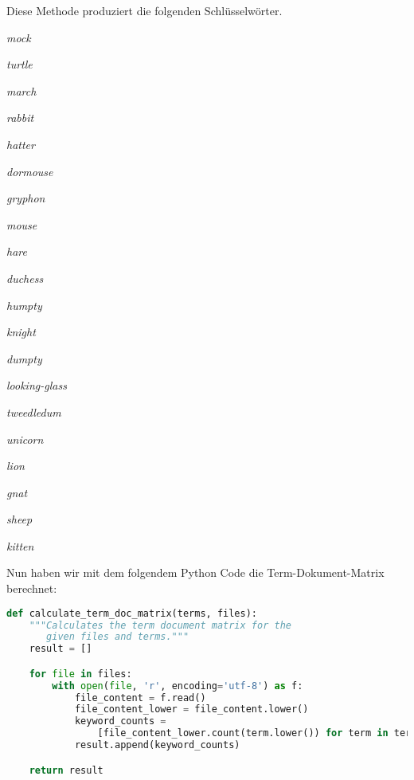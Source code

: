 \documentclass{article}
\begin{document}
\newpage
\noindent Diese Methode produziert die folgenden Schlüsselwörter.
\begin{center}
\begin{minipage}{.45\textwidth}
\begin{enumerate}
\begin{minipage}{0.35\linewidth}
    \item \textit{mock}
    \item \textit{turtle}
    \item \textit{march}
    \item \textit{rabbit}
    \item \textit{hatter}
    \item \textit{dormouse}
    \item \textit{gryphon}
    \item \textit{mouse}
    \item \textit{hare}
    \item \textit{duchess}
\end{minipage}
\begin{minipage}{0.35\linewidth}
    \item \textit{humpty}
    \item \textit{knight}
    \item \textit{dumpty}
    \item \textit{looking-glass}
    \item \textit{tweedledum}
    \item \textit{unicorn}
    \item \textit{lion}
    \item \textit{gnat}
    \item \textit{sheep}
    \item \textit{kitten}
\end{minipage}
\end{enumerate}
\end{minipage}
\end{center}
 Nun haben wir mit dem folgendem Python Code die Term-Dokument-Matrix berechnet:
\begin{center}
\begin{minipage}{0.8\linewidth}
\begin{lstlisting}[language=Python]
def calculate_term_doc_matrix(terms, files):
    """Calculates the term document matrix for the
       given files and terms."""
    result = []

    for file in files:
        with open(file, 'r', encoding='utf-8') as f:
            file_content = f.read()
            file_content_lower = file_content.lower()
            keyword_counts = 
                [file_content_lower.count(term.lower()) for term in terms]
            result.append(keyword_counts)

    return result
\end{lstlisting}
\end{minipage}
\end{center}
\end{document}
